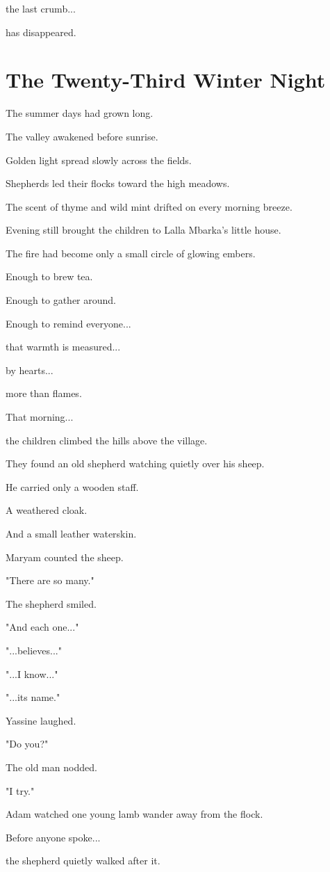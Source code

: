 \documentclass[12pt,openany]{book}
\begin{document}
the last crumb...

has disappeared.
\chapter{The Twenty-Third Winter Night}

The summer days had grown long.

The valley awakened before sunrise.

Golden light spread slowly across the fields.

Shepherds led their flocks toward the high meadows.

The scent of thyme and wild mint drifted on every morning breeze.

Evening still brought the children to Lalla Mbarka's little house.

The fire had become only a small circle of glowing embers.

Enough to brew tea.

Enough to gather around.

Enough to remind everyone...

that warmth is measured...

by hearts...

more than flames.

That morning...

the children climbed the hills above the village.

They found an old shepherd watching quietly over his sheep.

He carried only a wooden staff.

A weathered cloak.

And a small leather waterskin.

Maryam counted the sheep.

"There are so many."

The shepherd smiled.

"And each one..."

"...believes..."

"...I know..."

"...its name."

Yassine laughed.

"Do you?"

The old man nodded.

"I try."

Adam watched one young lamb wander away from the flock.

Before anyone spoke...

the shepherd quietly walked after it.
\end{document}
